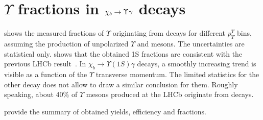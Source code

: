 \section[\texorpdfstring{$\Upsilon$ fractions}{Y fractions}]{\texorpdfstring{$\Upsilon$}{Y} fractions in \texorpdfstring{$\chi_{b} \rightarrow \Upsilon \gamma$}{chib --> Y gamma} decays}
\label{sec:fraction}

 shows the measured fractions of $\Upsilon$  originating
from \chib decays for different $p_T^{\Upsilon}$ bins,  assuming the production
of unpolarized $\Upsilon$ and \chib mesons. The uncertainties are statistical
only.  shows that the obtained \Y1S fractions are
consistent with the previous LHCb result~\cite{LHCb-PAPER-2012-015}. In $\chi_b
\rightarrow \Upsilon(1S) \gamma$ decays, a smoothly increasing trend is visible
as a function of the $\Upsilon$ transverse momentum. The limited statistics for
the other decay does not allow to draw a similar conclusion for them. Roughly
speaking, about 40\% of $\Upsilon$ mesons produced at the LHCb  
originate from \chib decays.





 provide the summary
of obtained yields, efficiency and fractions.


